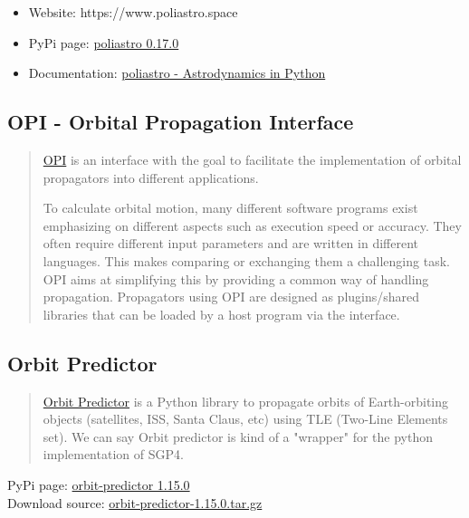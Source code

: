 \documentclass[a4paper,10pt]{article}
\begin{document}
\begin{itemize}
	\item Website: https://www.poliastro.space
	\item PyPi page: \href{https://pypi.org/project/poliastro/}{poliastro 0.17.0}
	\item Documentation: \href{https://docs.poliastro.space/en/stable/}{poliastro - Astrodynamics in Python}
\end{itemize}


\subsection{OPI - Orbital Propagation Interface}
\begin{quotation}
\href{https://github.com/Space-Systems/OPI}{OPI} is an interface with the goal to facilitate the implementation of orbital propagators into different applications.

To calculate orbital motion, many different software programs exist emphasizing on different aspects such as execution speed or accuracy. They often require different input parameters and are written in different languages. This makes comparing or exchanging them a challenging task. OPI aims at simplifying this by providing a common way of handling propagation. Propagators using OPI are designed as plugins/shared libraries that can be loaded by a host program via the interface.
\end{quotation}

\subsection{Orbit Predictor}
\begin{quotation}
\href{https://github.com/satellogic/orbit-predictor}{Orbit Predictor} is a Python library to propagate orbits of Earth-orbiting objects (satellites, ISS, Santa Claus, etc) using TLE (Two-Line Elements set). We can say Orbit predictor is kind of a "wrapper" for the python implementation of SGP4.
\end{quotation}

PyPi page: \href{https://pypi.org/project/orbit-predictor/}{orbit-predictor 1.15.0} \\
Download source: \href{https://files.pythonhosted.org/packages/c2/98/c1497925d73f522d17a2db3e704a85fdad17fcd191464b82fad82e73aedb/orbit-predictor-1.15.0.tar.gz}{orbit-predictor-1.15.0.tar.gz}
\end{document}
